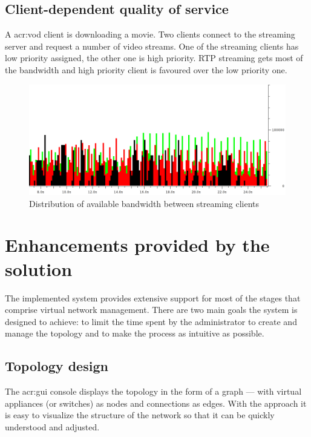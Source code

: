 \documentclass[11pt]{book}
\begin{document}
      \subsection{Client-dependent quality of service}
      \label{sub:uc:client}

        A \gls{acr:vod} client is downloading a movie. Two clients connect to the streaming server and request a number of video
        streams. One of the streaming clients has low priority assigned, the other one is high priority. RTP streaming
        gets most of the bandwidth and high priority client is favoured over the low priority one.

        \begin{figure}[H]
          \begin{center}
            \includegraphics[width=.7\textwidth]{img/test-case/exp-all.png}
          \end{center}

          \caption{Distribution of available bandwidth between streaming clients}
        \end{figure}


    \section{Enhancements provided by the solution}
    \label{sec:uc:enhance}

      The implemented system provides extensive support for most of the stages that comprise virtual network management.
      There are two main goals the system is designed to achieve: to limit the time spent by the administrator to create
      and manage the topology and to make the process as intuitive as possible.


      \subsection{Topology design}
      \label{sub:uc:enhance:design}

        The \gls{acr:gui} console displays the topology in the form of a graph --- with virtual appliances (or switches) as nodes
        and connections as edges. With the approach it is easy to visualize the structure of the network so that it can
        be quickly understood and adjusted.
\end{document}
